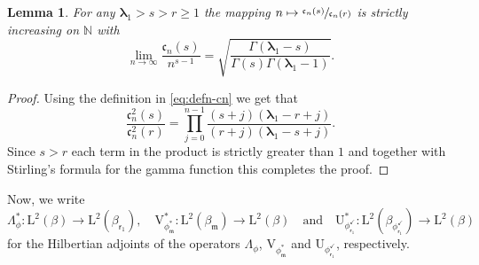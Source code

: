 \documentclass[JEP,XML,SOM,Unicode]{cedram}
\newcommand\mto{\mathchoice{\longmapsto}{\mapsto}{\mapsto}{\mapsto}}
\theoremstyle{plain}
\newtheorem{lemma}[theorem]{Lemma}
\theoremstyle{definition}
\newcommand{\N}{\mathbb{N}}
\newcommand{\Leb}{\mathrm{L}}
\newcommand{\m}{\mathfrak{m}}
\newcommand{\lam}{{\bm{\lambda}_1}}
\newcommand{\vat}{{\mathsf{r}_1}}
\newcommand{\phm}{{\phi_\m^*}}
\renewcommand{\varphi}{{\phi_{\vat}^{\checkmark}}}
\newcommand{\gab}[1][\lam,\mo]{{\beta_{#1}}}
\let\mo\mu
\let\bpsi\beta
\begin{document}
\begin{lemma}
\label{lem:seq-cn}
For any $\lam > s > r \geq 1$ the mapping $n \mto \sfrac{\mathfrak{c}_n(s)}{\mathfrak{c}_n(r)}$ is strictly increasing on $\N$ with
\begin{equation}
\label{eq:asymptotic-cn}
\lim_{n \to \infty} \frac{\mathfrak{c}_n(s)}{n^{s-1}} = \sqrt{\frac{\Gamma(\lam-s)}{\Gamma(s)\Gamma(\lam-1)}}.
\end{equation}
\end{lemma}

\begin{proof}
Using the definition in \eqref{eq:defn-cn} we get that
\begin{equation*}
\frac{\mathfrak{c}_n^2(s)}{\mathfrak{c}_n^2(r)} = \prod_{j=0}^{n-1} \frac{(s+j)(\lam-r+j)}{(r+j)(\lam-s+j)}.
\end{equation*}
Since $s > r$ each term in the product is strictly greater than $1$ and together with Stirling's formula for the gamma function this completes the proof.
\end{proof}

Now, we write
\[
\Lambda^*_{\phi} \colon \Leb^2(\beta) \to \Leb^2(\beta_{\vat}),\quad \mathrm{V}_{\phm}^* : \Leb^2(\gab[\m]) \to \Leb^2(\bpsi)\quad \text{and}\quad {\mathrm{U}}_\varphi^* : \Leb^2(\bpsi_\varphi) \to \Leb^2(\bpsi)
\]
for the Hilbertian adjoints of the operators
$\Lambda_{\phi}$, $\mathrm{V}_{\phm}$ and ${\mathrm{U}}_\varphi$, respectively.
\end{document}
